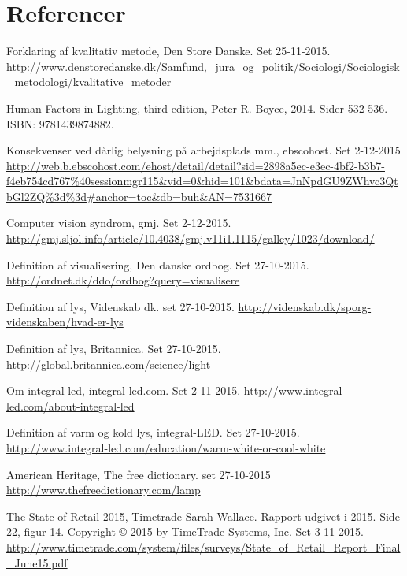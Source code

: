 \section{Referencer}

\begin{thebibliography}{99}


  Forklaring af kvalitativ metode,
  Den Store Danske.
  Set 25-11-2015.
  \url{http://www.denstoredanske.dk/Samfund,_jura_og_politik/Sociologi/Sociologisk_metodologi/kvalitative_metoder}

  Human Factors in Lighting, third edition,
  Peter R. Boyce, 2014.
  Sider 532-536.
  ISBN: 9781439874882.

  Konsekvenser ved dårlig belysning på arbejdsplads mm.,
  ebscohost.
  Set 2-12-2015
  \url{http://web.b.ebscohost.com/ehost/detail/detail?sid=2898a5ec-e3ec-4bf2-b3b7-f4eb754cd767%40sessionmgr115&vid=0&hid=101&bdata=JnNpdGU9ZWhvc3QtbGl2ZQ%3d%3d#anchor=toc&db=buh&AN=7531667}
  
  Computer vision syndrom,
  gmj.
  Set 2-12-2015.
  \url{http://gmj.sljol.info/article/10.4038/gmj.v11i1.1115/galley/1023/download/}
  
  Definition af visualisering,
  Den danske ordbog.
  Set 27-10-2015.
  \url{http://ordnet.dk/ddo/ordbog?query=visualisere}
  
  Definition af lys,
  Videnskab dk.
  set 27-10-2015.
  \url{http://videnskab.dk/sporg-videnskaben/hvad-er-lys}
  
  Definition af lys,
  Britannica.
  Set 27-10-2015.
  \url{http://global.britannica.com/science/light}

  Om integral-led,
  integral-led.com.
  Set 2-11-2015.
  \url{http://www.integral-led.com/about-integral-led}
  
  Definition af varm og kold lys,
  integral-LED.
  Set 27-10-2015.
  \url{http://www.integral-led.com/education/warm-white-or-cool-white}

  American Heritage,
  The free dictionary.
  set 27-10-2015
  \url{http://www.thefreedictionary.com/lamp}

  The State of Retail 2015,
  Timetrade
  Sarah Wallace.
  Rapport udgivet i 2015.
  Side 22, figur 14.
  Copyright © 2015 by TimeTrade Systems, Inc.
  Set 3-11-2015.
  \url{http://www.timetrade.com/system/files/surveys/State_of_Retail_Report_Final_June15.pdf}


\end{thebibliography}
